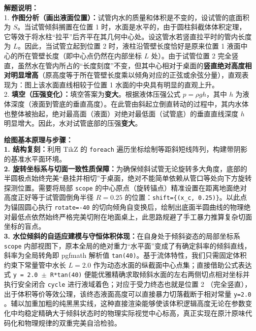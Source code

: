 \documentclass[12pt, a4paper]{ctexrep}
\begin{document}
\vspace{0.6cm}

{\small\color{gray}
\textbf{解题说明：}\\
1. \textbf{作图分析（画出液面位置）：}试管内水的质量和体积是不变的，设试管的底面积为 $S$。当试管倾斜搁置在位置 1 时，水面是水平的，由于圆柱斜截体体积定理，它等效于将水柱“拉平”后齐平在其几何中心处。设这管水若竖直拉平时的管内长度为 $L$。因此，当试管立起到位置 2 时，液柱沿管壁长度恰好是原来位置 1 液面中心的所在管壁长度（即中心点仍然在内部坐标 $L$ 处）。由于试管位置 2 完全竖直，虽然水在管内所占的“长度刻度”不变，但其中心相对于桌面的\textbf{竖直绝对高度相对明显增高}（原高度等于所在管壁长度乘以倾角对应的正弦或余弦分量），直观表现为：图上该水面直线相较于位置 1 水面的中央具有明显的直观上升。\\
2. \textbf{填空（压强变化）：}填空答案为\textbf{变大}。根据液体压强公式 $p = \rho g h$，其中 $h$ 为液体深度（液面到管底的垂直高度）。在此管由斜起立倒直转动的过程中，其内水体也整体被抬起，绝对最高面（液面）对绝对最低面（试管底）的垂直直线深度 $h$ 明显增大。因此，水对试管底部的压强\textbf{变大}。
}

\vspace{0.6cm}

{\small\color{blue!70!black}
\textbf{绘图基本原理与步骤：}\\
\textbf{1. 结构复刻：}利用 TikZ 的 \texttt{foreach} 遍历坐标绘制等距斜短线阵列，构建带阴影的基准水平面环境。\\
\textbf{2. 旋转坐标系与切面一致性质保障：}为确保倾斜试管无论旋转多大角度，底部的半圆极点始终完美“悬挂并相切”于桌面，绝对不能简单依赖从管口等处向下方旋转探测位置。需要将局部 \texttt{scope} 的中心原点（旋转锚点）精准设置在距离地面绝对高度正好等于试管圆倒角半径 $R=0.25$ 的位置：\texttt{shift=\{(x\_c, 0.25)\}}。以此点为锚固圆心执行 \texttt{rotate=-40} 的切向倾角自变换后，绘制出底面半圆曲线的物理绝对最低点依然始终严格完美切附在地面桌上，此思路规避了手工暴力推算复杂切面坐标的盲点。\\
\textbf{3. 水位倾斜的自适应建模与守恒体积体现：}在自身处于倾斜姿态的局部坐标系 \texttt{scope} 内部视图下，原本全局的绝对重力“水平面”变成了有确定斜率的倾斜直线，斜率为全局转角即 pgfmath 解析值 \texttt{tan(40)}。基于流体特性，我们只需固定体积约束下常量管中水长 $L=2.0$ 作为动态水面的纵截面中心点集；直接借助公式表达式 \texttt{y = 2.0 $\pm$ R*tan(40)} 便能优雅精确求取倾斜水面的左右两侧切点相对坐标并执行安全闭合 \texttt{cycle} 进行液域着色；对应于受力终态也就是位置 2 （完全竖直），出于体积等价等效公理，该终态液面高度可以直接暴力切落截断于相对常量 \texttt{y=2.0} 。辅以加重加粗的纯黑黑实线，这种直接渲染能够使该体积逻辑高度无论在参数变化中均稳定精确大于倾斜状态时的物理实际视觉中心标高，真正实现在原汁原味代码化和物理规律的双重完美自洽检验。
}
\end{document}
